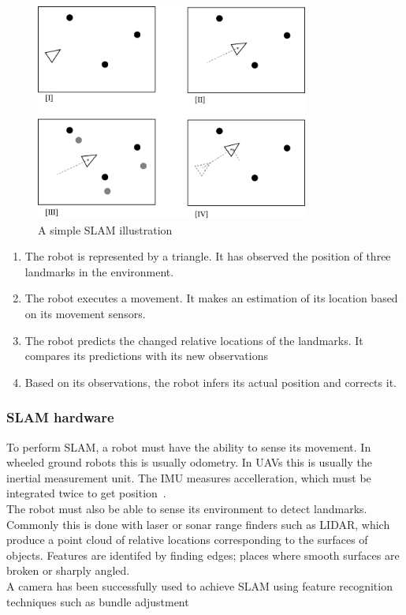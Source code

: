 \documentclass[a4paper, 12pt, titlepage]{article}
\begin{document}
	\begin{figure}[h!]
		\includegraphics[width=0.8\textwidth]{SLAM.png}
		\centering
		\caption{A simple SLAM illustration}
	\end{figure}
	
	\begin{enumerate}
  		 
  		\item The robot is represented by a triangle. It has observed the position of three landmarks in the environment.
  		
  		\item The robot executes a movement. It makes an estimation of its location based on its movement sensors.
  		
  		\item The robot predicts the changed relative locations of the landmarks. It compares its predictions with its new observations
  		
  		\item Based on its observations, the robot infers its actual position and corrects it.
  		\end{enumerate}
	

	
		\subsubsection{SLAM hardware}
		To perform SLAM, a robot must have the ability to sense its movement. In wheeled ground robots this is usually odometry. In UAVs this is usually the inertial measurement unit. The IMU measures accelleration, which must be integrated twice to get position~\cite{kim2007real}.
		\\The robot must also be able to sense its environment to detect landmarks. Commonly this is done with laser or sonar range finders such as LIDAR, which produce a point cloud of relative locations corresponding to the surfaces of objects. Features are identifed by finding edges; places where smooth surfaces are broken or sharply angled.
		\\A camera has been successfully used to achieve SLAM using feature recognition techniques such as bundle adjustment%
		
\end{document}
